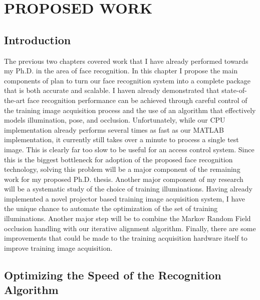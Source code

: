 \chapter{PROPOSED WORK}
\label{chap:proposed}

\section{Introduction}
The previous two chapters covered work that I have already performed towards my Ph.D. in the area of face recognition.  In this chapter I propose the main components of plan to turn our face recognition system into a complete package that is both accurate and scalable.  I haven already demonstrated that state-of-the-art face recognition performance can be achieved through careful control of the training image acquisition process and the use of an algorithm that effectively models illumination, pose, and occlusion.  Unfortunately, while our CPU implementation already performs several times as fast as our MATLAB implementation, it currently still takes over a minute to process a single test image.  This is clearly far too slow to be useful for an access control system. Since this is the biggest bottleneck for adoption of the proposed face recognition technology, solving this problem will be a major component of the remaining work for my proposed Ph.D. thesis.  Another major component of my research will be a systematic study of the choice of training illuminations.  Having already implemented a novel projector based training image acquisition system, I have the unique chance to automate the optimization of the set of training illuminations.  Another major step will be to combine the Markov Random Field occlusion handling with our iterative alignment algorithm.  Finally, there are some improvements that could be made to the training acquisition hardware itself to improve training image acquisition.  

\section{Optimizing the Speed of the Recognition Algorithm}


